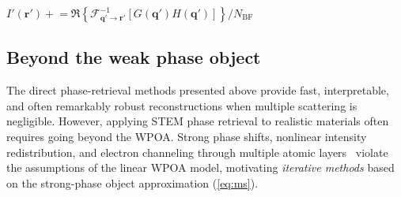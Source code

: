 \documentclass[pdflatex,sn-aps,iicol]{sn-jnl}%
\begin{document}
\begin{algorithm}
\begin{algorithmic}
  \Statex $I'(\boldsymbol{r}') \mathrel{+}= \Re\!\left\{\mathcal{F}^{-1}_{\boldsymbol{q}'\rightarrow\boldsymbol{r}'}[G(\boldsymbol{q}')H(\boldsymbol{q}')]\right\}/N_{\mathrm{BF}}$
\EndFor

\end{algorithmic}
\end{algorithm}

\subsection*{Beyond the weak phase object}

The direct phase-retrieval methods presented above provide fast, interpretable, and often remarkably robust reconstructions when multiple scattering is negligible.
However, applying STEM phase retrieval to realistic materials often requires going beyond the WPOA.
Strong phase shifts, nonlinear intensity redistribution, and electron channeling through multiple atomic layers~\cite{Williams_2009,Carter_2016,Kirkland_2020}
violate the assumptions of the linear WPOA model, motivating \emph{iterative methods} based on the strong-phase object approximation (\cref{eq:ms}).
\end{document}
